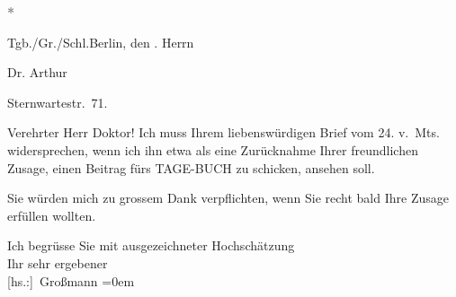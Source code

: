 \pstart
           \centering{}\textcolor{gray}{\textbf{*}}\pend
           
\pstart
           Tgb./Gr./Schl.\hfill Berlin, den \label{K_L02464-1v}\label{K_L02464-1}.\pend
           {\vspace{1\baselineskip}}
\pstart
           \raggedleft{}Herrn\pend
           
\pstart
           \raggedleft{}Dr. Arthur \pend
           
\pstart
           \raggedleft{}\pend
           
\pstart
           \raggedleft{}Sternwartestr. 71.\pend
           
\pstart\center{}Verehrter Herr Doktor!\pend\vspace{0.5em}
\pstart
           Ich muss Ihrem liebenswürdigen Brief vom 24. v. Mts. widersprechen, wenn
               ich ihn etwa als eine Zurücknahme Ihrer freundlichen Zusage, einen Beitrag fürs TAGE-BUCH zu schicken, ansehen soll.\pend
           
\pstart
           Sie würden mich zu grossem Dank verpflichten, wenn Sie recht bald Ihre Zusage
               erfüllen wollten.\pend
           
\pstart
           Ich begrüsse Sie mit ausgezeichneter Hochschätzung{\\[\baselineskip]}Ihr sehr ergebener{\\[\baselineskip]}\spacefill\mbox{{[}hs.:{]} Großmann}\pend
           \leftskip=0em{}\endnumbering{}  \newcommand{\dateiname}{L02464}\newcommand{\titel}{Stefan Großmann an Arthur Schnitzler, 2. 1. 192[6?]}\newcommand{\editorInnen}{Herausgegeben von Martin Anton Müller}
